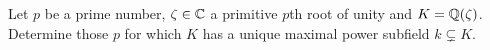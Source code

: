 \begin{problem}
  Let \(p\) be a prime number, \(\zeta\in\mathbb{C}\) a primitive \(p\)th root of
  unity and \(K=\mathbb{Q}(\zeta)\). Determine those \(p\) for which \(K\) has a
  unique maximal power subfield \(k\subsetneq K\).
\end{problem}
\begin{solution}
\end{solution}

